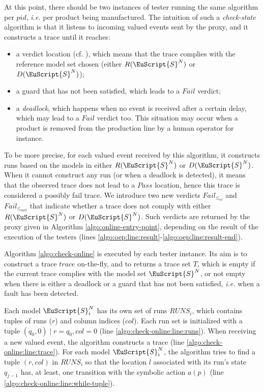 At this point, there should be two instances of tester running
the same algorithm per $pid$, \emph{i.e.} per product being
manufactured. The intuition of such a \emph{check-state}
algorithm is that it listens to incoming valued events sent by
the proxy, and it constructs a trace until it reaches:

\begin{itemize}
    \item a verdict location (cf.
        ), which means
        that the trace complies with the reference model set
        chosen (either $R(\EuScript{S}^N)$ or
        $D(\EuScript{S}^N)$);

    \item a guard that has not been satisfied, which leads to a
        $Fail$ verdict;

    \item a \emph{deadlock}, which happens when no event is
        received after a certain delay, which may lead to a $Fail$
        verdict too. This situation may occur when a product is
        removed from the production line by a human operator for
        instance.
\end{itemize}

To be more precise, for each valued event received by this
algorithm, it constructs runs based on the models in either
$R(\EuScript{S}^N)$ or $D(\EuScript{S}^N)$. When it cannot
construct any run (or when a deadlock is detected), it means that
the observed trace does not lead to a $Pass$ location, hence this
trace is considered a possibly fail trace.
We introduce two new verdicts $Fail_{\leq_{ct}}$ and
$Fail_{\leq_{mct}}$ that indicate whether a trace does not comply
with either $R(\EuScript{S}^N)$ or $D(\EuScript{S}^N)$. Such
verdicts are returned by the proxy given in Algorithm
\ref{algo:online-entry-point}, depending on the result of the
execution of the testers (lines
\ref{algo:oep:line:result}-\ref{algo:oep:line:result-end}).

Algorithm \ref{algo:check-online} is executed by each tester
instance. Its aim is to construct a trace $trace$ on-the-fly, and
to returns a trace set $T$, which is empty if the current trace
complies with the model set $\EuScript{S}^N$, or not empty when
there is either a deadlock or a guard that has not been
satisfied, \emph{i.e.} when a fault has been detected.

Each model $\EuScript{S}_i^N$ has its own set of runs $RUNS_i$,
which contains tuples of runs ($r$) and column indices ($col$).
Each run set is initialized with a tuple $(q_0, 0) \mid r = q_0,
col = 0$ (line \ref{algo:check-online:line:runs}). When receiving
a new valued event, the algorithm constructs a trace (line
\ref{algo:check-online:line:trace}). For each model
$\EuScript{S}_i^N$, the algorithm tries to find a tuple $(r,
col)$ in $RUNS_i$ so that the location $l$ associated with its
run's state $q_{j - 1}$ has, at least, one transition with the
symbolic action $a(p)$ (line
\ref{algo:check-online:line:while-tuple}).

